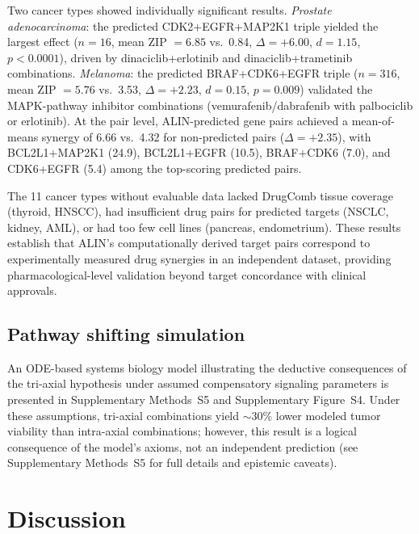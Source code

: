 \documentclass[times, twoside, watermark]{zHenriquesLab-StyleBioRxiv}
\begin{document}
Two cancer types showed individually significant results. \emph{Prostate adenocarcinoma}: the predicted CDK2+EGFR+MAP2K1 triple yielded the largest effect ($n = 16$, mean ZIP $= 6.85$ vs.\ 0.84, $\Delta = +6.00$, $d = 1.15$, $p < 0.0001$), driven by dinaciclib+erlotinib and dinaciclib+trametinib combinations. \emph{Melanoma}: the predicted BRAF+CDK6+EGFR triple ($n = 316$, mean ZIP $= 5.76$ vs.\ 3.53, $\Delta = +2.23$, $d = 0.15$, $p = 0.009$) validated the MAPK-pathway inhibitor combinations (vemurafenib/dabrafenib with palbociclib or erlotinib). At the pair level, ALIN-predicted gene pairs achieved a mean-of-means synergy of 6.66 vs.\ 4.32 for non-predicted pairs ($\Delta = +2.35$), with BCL2L1+MAP2K1 (24.9), BCL2L1+EGFR (10.5), BRAF+CDK6 (7.0), and CDK6+EGFR (5.4) among the top-scoring predicted pairs.

The 11 cancer types without evaluable data lacked DrugComb tissue coverage (thyroid, HNSCC), had insufficient drug pairs for predicted targets (NSCLC, kidney, AML), or had too few cell lines (pancreas, endometrium). These results establish that ALIN's computationally derived target pairs correspond to experimentally measured drug synergies in an independent dataset, providing pharmacological-level validation beyond target concordance with clinical approvals.

\subsection*{Pathway shifting simulation}
An ODE-based systems biology model illustrating the deductive consequences of the tri-axial hypothesis under assumed compensatory signaling parameters is presented in Supplementary Methods~S5 and Supplementary Figure~S4. Under these assumptions, tri-axial combinations yield $\sim$30\% lower modeled tumor viability than intra-axial combinations; however, this result is a logical consequence of the model's axioms, not an independent prediction (see Supplementary Methods~S5 for full details and epistemic caveats).

\section*{Discussion}
\end{document}
